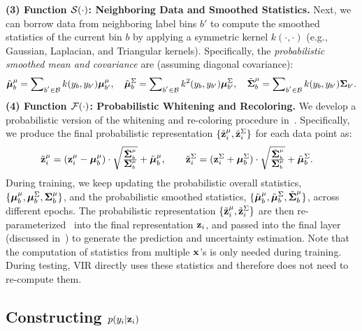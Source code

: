 \textbf{(3) Function ${\mathcal S}(\cdot)$: Neighboring Data and Smoothed Statistics.} 
Next, we can borrow data 
from neighboring label bins $b'$ 
to compute the smoothed statistics of the current bin $b$ {by applying a symmetric kernel $k(\cdot, \cdot)$ (e.g., Gaussian, Laplacian, and Triangular kernels).} Specifically, the \emph{probabilistic smoothed mean and covariance} are (assuming diagonal covariance):
%
\begin{align*}
\Tilde{\muu}_b^{\mu} = \sum\nolimits_{b^{'} \in \mathcal{B}} k(y_{b}, y_{b'}) \muu_{b'}^{\mu},\ \ \ 
\Tilde{\muu}_b^{\Sigma} = \sum\nolimits_{b^{'} \in \mathcal{B}} k^{2}(y_{b}, y_{b'}) \muu_{b'}^{\Sigma},\ \ \ 
\Tilde{\Si}_b^\mu = \sum\nolimits_{b^{'} \in \mathcal{B}} k(y_{b}, y_{b'}) \Si_{b'}.
\end{align*}
%
\textbf{(4) Function ${\mathcal F}(\cdot)$: Probabilistic Whitening and Recoloring.} 
We develop a probabilistic version of the whitening and re-coloring procedure in~\citep{whitening, DIR}. Specifically, we produce the final probabilistic representation $\{ \Tilde{{\bf z}}_i^{\mu}, \Tilde{{\bf z}}_i^{\Sigma} \}$ for each data point as:
%
\begin{align}
\Tilde{\z}_i^{\mu} &= (\z_i^{\mu} - \muu_{b}^{\mu}) \cdot \sqrt{\frac{\Tilde{\Si}_b^\mu}{\Si_b^\mu}} + \Tilde{\muu}_b^{\mu}, \ \ \ \ \ \ 
\Tilde{\z}_i^{\Sigma} = (\z_i^{\Sigma} + \muu_{b}^{\Sigma}) \cdot \sqrt{\frac{\Tilde{\Si}_b^\mu}{\Si_b^\mu}} + \Tilde{\muu}_b^{\Sigma}.\label{eq:final_mu_sigma}
\end{align}
%
During training, we keep updating the probabilistic overall statistics, $\{ \mbox{\boldmath$\mu$\unboldmath}_{b}^{\mu}, \mbox{\boldmath$\mu$\unboldmath}_{b}^{\Sigma}, \mbox{\boldmath$\Sigma$\unboldmath}_b^{\mu} \}$, and the probabilistic smoothed statistics, $\{ \Tilde{\mbox{\boldmath$\mu$\unboldmath}}_b^{\mu}, \Tilde{\mbox{\boldmath$\mu$\unboldmath}}_b^{\Sigma}, \Tilde{\mbox{\boldmath$\Sigma$\unboldmath}}_b^{\mu} \}$, across different epochs. 
The probabilistic representation $\{ \Tilde{{\bf z}}_i^{\mu}, \Tilde{{\bf z}}_i^{\Sigma} \}$ are then re-parameterized~\citep{VAE} into the final representation ${\bf z}_i$, and passed into the final layer (discussed in~) to generate the prediction and uncertainty estimation. {Note that the computation of statistics from multiple ${\bf x}$'s is only needed during training. During testing, VIR directly uses these statistics and therefore does not need to re-compute them.} 

\subsection{Constructing \texorpdfstring{$p(y_i|{\bf z}_i)$}{p(yi|zi)}}\label{sec:CDM}

